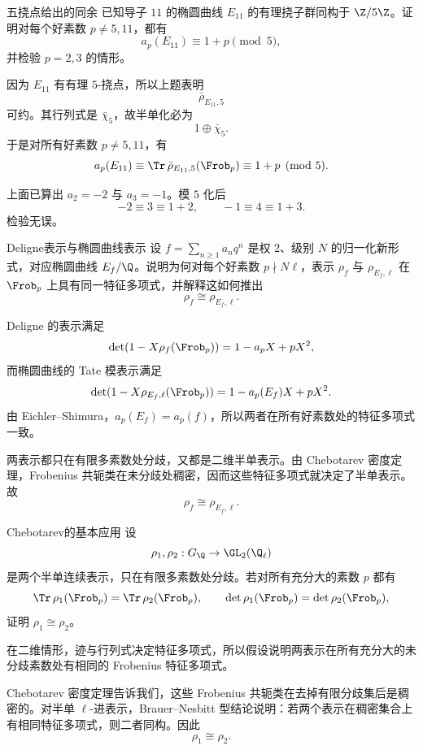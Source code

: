 \begin{problem}{五挠点给出的同余}
\medium
已知导子 $11$ 的椭圆曲线 $E_{11}$ 的有理挠子群同构于 $\Z/5\Z$。证明对每个好素数 $p\neq5,11$，都有
\[
a_p(E_{11})\equiv 1+p\pmod5,
\]
并检验 $p=2,3$ 的情形。
\end{problem}
\begin{solution}
因为 $E_{11}$ 有有理 $5$-挠点，所以上题表明
\[
\bar\rho_{E_{11},5}
\]
可约。其行列式是 $\bar\chi_5$，故半单化必为
\[
1\oplus\bar\chi_5.
\]
于是对所有好素数 $p\neq5,11$，有
\[
a_p(E_{11})\equiv \Tr\,\bar\rho_{E_{11},5}(\Frob_p)\equiv 1+p\pmod5.
\]

上面已算出 $a_2=-2$ 与 $a_3=-1$。模 $5$ 化后
\[
-2\equiv3\equiv1+2,
\qquad
-1\equiv4\equiv1+3.
\]
检验无误。
\end{solution}

\begin{problem}{Deligne表示与椭圆曲线表示}
\medium
设 $f=\sum_{n\ge1}a_nq^n$ 是权 $2$、级别 $N$ 的归一化新形式，对应椭圆曲线 $E_f/\Q$。说明为何对每个好素数 $p\nmid N\ell$，表示 $\rho_f$ 与 $\rho_{E_f,\ell}$ 在 $\Frob_p$ 上具有同一特征多项式，并解释这如何推出
\[
\rho_f\cong\rho_{E_f,\ell}.
\]
\end{problem}
\begin{solution}
Deligne 的表示满足
\[
\det(1-X\rho_f(\Frob_p))=1-a_pX+pX^2,
\]
而椭圆曲线的 Tate 模表示满足
\[
\det(1-X\rho_{E_f,\ell}(\Frob_p))=1-a_p(E_f)X+pX^2.
\]
由 Eichler--Shimura，$a_p(E_f)=a_p(f)$，所以两者在所有好素数处的特征多项式一致。

两表示都只在有限多素数处分歧，又都是二维半单表示。由 Chebotarev 密度定理，Frobenius 共轭类在未分歧处稠密，因而这些特征多项式就决定了半单表示。故
\[
\rho_f\cong\rho_{E_f,\ell}.
\]
\end{solution}

\begin{problem}{Chebotarev的基本应用}
\medium
设
\[
\rho_1,\rho_2:G_\Q\to\GL_2(\Q_\ell)
\]
是两个半单连续表示，只在有限多素数处分歧。若对所有充分大的素数 $p$ 都有
\[
\Tr\,\rho_1(\Frob_p)=\Tr\,\rho_2(\Frob_p),
\qquad
\det\rho_1(\Frob_p)=\det\rho_2(\Frob_p),
\]
证明 $\rho_1\cong\rho_2$。
\end{problem}
\begin{solution}
在二维情形，迹与行列式决定特征多项式，所以假设说明两表示在所有充分大的未分歧素数处有相同的 Frobenius 特征多项式。

Chebotarev 密度定理告诉我们，这些 Frobenius 共轭类在去掉有限分歧集后是稠密的。对半单 $\ell$-进表示，Brauer--Nesbitt 型结论说明：若两个表示在稠密集合上有相同特征多项式，则二者同构。因此
\[
\rho_1\cong\rho_2.
\]
\end{solution}

